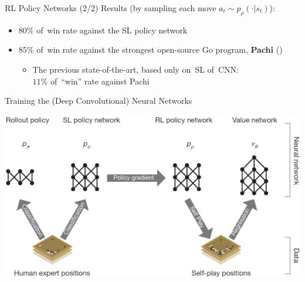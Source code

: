 \documentclass{beamer}
\begin{document}
{    \begin{frame}{RL Policy Networks (2/2)}
      Results (by sampling each move $a_t \sim p_\rho(\cdot | s_t)$):
      \pause
      \begin{itemize}[<+- | alert@+>]
        \item $80\%$ of~win rate against the SL policy network
        \item $85\%$ of~win rate against the strongest open-source Go program, \textbf{Pachi} (\cite{Baudivs2011pachi})
          \begin{itemize}[<+- | alert@+>]
            \item The previous state-of-the-art, based only on~SL of~CNN: \\
              \pause
              $11\%$ of~``win'' rate against Pachi
          \end{itemize}
      \end{itemize}
    \end{frame}

    \begin{frame}{Training the (Deep Convolutional) Neural Networks}
      \begin{center}
        \includegraphics[width=\textwidth]{../img/neural_nets_pipeline.png}
      \end{center}
    \end{frame}

}
\end{document}
